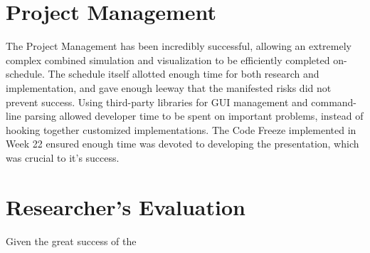 \section{Project Management}
The Project Management has been incredibly successful, allowing an extremely complex combined simulation and visualization to be efficiently completed on-schedule.
The schedule itself allotted enough time for both research and implementation, and gave enough leeway that the manifested risks did not prevent success.
Using third-party libraries for GUI management and command-line parsing allowed developer time to be spent on important problems, instead of hooking together customized implementations.
The Code Freeze implemented in Week 22 ensured enough time was devoted to developing the presentation, which was crucial to it's success.






\section{Researcher's Evaluation}
Given the great success of the 